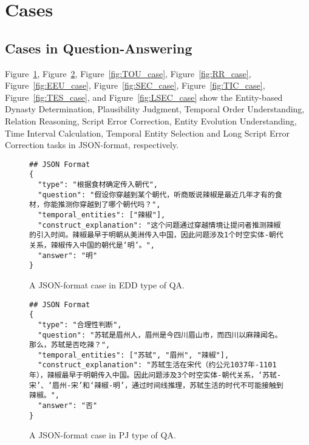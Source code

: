 \section{Cases}\label{app:cases}
\subsection{Cases in Question-Answering}\label{app:qa-case}
Figure~\ref{fig:EDD_case}, Figure~\ref{fig:PJ_case}, Figure~\ref{fig:TOU_case}, Figure~\ref{fig:RR_case}, Figure~\ref{fig:EEU_case}, Figure~\ref{fig:SEC_case}, Figure~\ref{fig:TIC_case}, Figure~\ref{fig:TES_case}, and Figure~\ref{fig:LSEC_case} show the Entity-based Dynasty Determination, Plausibility Judgment, Temporal Order Understanding, Relation Reasoning, Script Error Correction, Entity Evolution Understanding, Time Interval Calculation, Temporal Entity Selection and Long Script Error Correction tasks in JSON-format, respectively.

\begin{figure}[ht]
\begin{tcolorbox}[title={\textbf{\small Entity-based Dynasty Determination (EDD)}}, colback=whitesmoke, colframe=royalblue(web), boxrule=2pt, arc=0mm]
{\small
\begin{verbatim}
## JSON Format
{
  "type": "根据食材确定传入朝代",
  "question": "假设你穿越到某个朝代，听商贩说辣椒是最近几年才有的食材，你能推测你穿越到了哪个朝代吗？",
  "temporal_entities": ["辣椒"],
  "construct_explanation": "这个问题通过穿越情境让提问者推测辣椒的引入时间。辣椒最早于明朝从美洲传入中国，因此问题涉及1个时空实体-朝代关系，辣椒传入中国的朝代是‘明’。",
  "answer": "明"
}
\end{verbatim}
}
\end{tcolorbox}
\caption{A JSON-format case in EDD type of QA.}
\label{fig:EDD_case}
\end{figure}


\begin{figure}[ht]
\begin{tcolorbox}[title={\textbf{\small Plausibility Judgment (PJ)}}, colback=whitesmoke, colframe=royalblue(web), boxrule=2pt, arc=0mm]
{\small
\begin{verbatim}
## JSON Format
{
  "type": "合理性判断", 
  "question": "苏轼是眉州人，眉州是今四川眉山市，而四川以麻辣闻名。那么，苏轼是否吃辣？",
  "temporal_entities": ["苏轼", "眉州", "辣椒"],
  "construct_explanation": "苏轼生活在宋代（约公元1037年-1101年），辣椒最早于明朝传入中国。因此问题涉及3个时空实体-朝代关系，‘苏轼-宋’、‘眉州-宋’和‘辣椒-明’，通过时间线推理，苏轼生活的时代不可能接触到辣椒。",
  "answer": "否"
}
\end{verbatim}
}
\end{tcolorbox}
\caption{A JSON-format case in PJ type of QA.}
\label{fig:PJ_case}
\end{figure}



